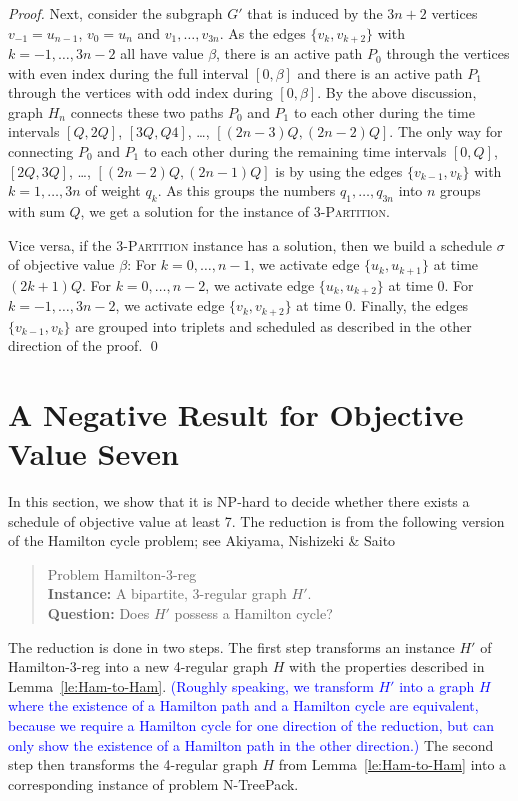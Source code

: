 \documentclass[runningheads]{llncs}
\newcommand{\set}[1]{\{ #1 \}}
\newcommand{\xxxNTP}{{\sc N-TreePack}}
\newcommand{\xxxHAM}{{\sc Hamilton-3-reg}}
\newcommand{\lasse}[1]{\textcolor{blue}{#1}}
\begin{document}
\begin{proof}
Next, consider the subgraph $G'$ that is induced by the $3n+2$ vertices $v_{-1}=u_{n-1}$, $v_0=u_n$ and 
$v_1,\ldots,v_{3n}$.
As the edges $\{v_k, v_{k+2}\}$ with $k=-1,\ldots,3n-2$ all have value $\beta$, there is an active path $P_0$ 
through the vertices with even index during the full interval $[0,\beta]$ and there is an active 
path $P_1$ through the vertices with odd index during $[0, \beta]$.
By the above discussion, graph $H_n$ connects these two paths $P_0$ and $P_1$ to each other during the
time intervals $[Q,2Q]$, $[3Q,Q4]$, \dots, $[(2n-3)Q,(2n-2)Q]$.
The only way for connecting $P_0$ and $P_1$ to each other during the remaining time intervals 
$[0,Q]$, $[2Q,3Q]$, \dots, $[(2n-2)Q,(2n-1)Q]$ is by using the edges $\{v_{k-1},v_k\}$ with $k=1,\ldots,3n$ of 
weight $q_k$.
As this groups the numbers $q_1,\ldots,q_{3n}$ into $n$ groups with sum $Q$, we get a solution
for the instance of \textsc{3-Partition}.

Vice versa, if the \textsc{3-Partition} instance has a solution, then we  build a schedule $\sigma$
of objective value $\beta$: For $k=0,\ldots,n-1$, we activate edge $\set{u_k, u_{k+1}}$ at time $(2k+1)Q$. For $k=0,\ldots,n-2$, we activate edge $\set{u_k, u_{k+2}}$ at time $0$. For $k=-1,\ldots,3n-2$, we activate edge $\set{v_k, v_{k+2}}$ at time $0$. Finally, the edges $\set{v_{k-1},v_k}$ are grouped into triplets and scheduled as described in the other direction of the proof.
\qed
\end{proof}


\section{A Negative Result for Objective Value Seven}
\label{sec:value-seven}
In this section, we show that it is NP-hard to decide whether there exists a schedule of objective value at least 7. 
The reduction is from the following version of the Hamilton cycle problem; 
see Akiyama, Nishizeki \& Saito \cite{hamilton3regularBip}
\begin{quote}
Problem {\xxxHAM}
\\
\textbf{Instance:} A bipartite, 3-regular graph $H'$.  
\\
\textbf{Question:} Does $H'$ possess a Hamilton cycle? 
\end{quote}
The reduction is done in two steps.
The first step transforms an instance $H'$ of {\xxxHAM} into a new 4-regular graph $H$ 
with the properties described in Lemma~\ref{le:Ham-to-Ham}.
\lasse{(Roughly speaking, we transform $H'$ into a graph $H$ where the existence of a Hamilton path and a Hamilton cycle are equivalent, because we require a Hamilton cycle for one direction of the reduction, but can only show the existence of a Hamilton path in the other direction.)}
The second step then transforms the 4-regular graph $H$ from Lemma~\ref{le:Ham-to-Ham}
into a corresponding instance of problem {\xxxNTP}.
\end{document}
